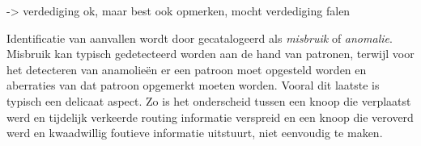 \TODO -> verdediging ok, maar best ook opmerken, mocht verdediging falen

Identificatie van aanvallen wordt door \cite{zhang2000intrusion} gecatalogeerd
als \emph{misbruik} of \emph{anomalie}. Misbruik kan typisch gedetecteerd
worden aan de hand van patronen, terwijl voor het detecteren van anamolie\"en
er een patroon moet opgesteld worden en aberraties van dat patroon opgemerkt
moeten worden. Vooral dit laatste is typisch een delicaat aspect. Zo is het
onderscheid tussen een knoop die verplaatst werd en tijdelijk verkeerde routing
informatie verspreid en een knoop die veroverd werd en kwaadwillig foutieve
informatie uitstuurt, niet eenvoudig te maken.
